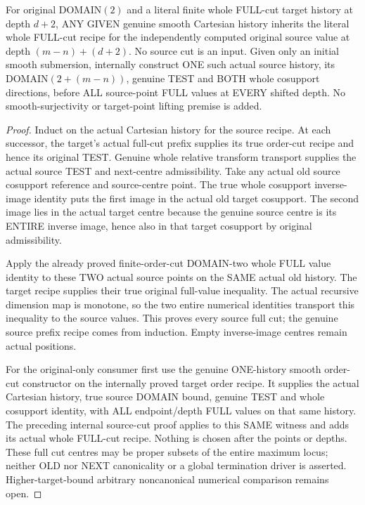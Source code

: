 \begin{theorem}
\label{hir:original-finite-full-cut-domain-two-smooth-history}
\leanok
For original DOMAIN$(2)$ and a literal finite whole FULL-cut target history
at depth $d+2$, ANY GIVEN genuine smooth Cartesian history inherits the
literal whole FULL-cut recipe for the independently computed original
source value at depth $(m-n)+(d+2)$. No source cut is an input.
Given only an initial smooth submersion, internally construct ONE such
actual source history, its DOMAIN$(2+(m-n))$, genuine TEST and BOTH whole
cosupport directions, before ALL source-point FULL values at EVERY shifted
depth. No smooth-surjectivity or target-point lifting premise is added.
\end{theorem}
\begin{proof}
Induct on the actual Cartesian history for the source recipe. At each
successor, the target's actual full-cut prefix supplies its true order-cut
recipe and hence its original TEST. Genuine whole relative transform
transport supplies the actual source TEST and next-centre admissibility.
Take any actual old source cosupport reference and source-centre point.
The true whole cosupport inverse-image identity puts the first image in
the actual old target cosupport. The second image lies in the actual
target centre because the genuine source centre is its ENTIRE inverse
image, hence also in that target cosupport by original admissibility.

Apply the already proved finite-order-cut DOMAIN-two whole FULL value
identity to these TWO actual source points on the SAME actual old history.
The target recipe supplies their true original full-value inequality.
The actual recursive dimension map is monotone, so the two entire
numerical identities transport this inequality to the source values.
This proves every source full cut; the genuine source prefix recipe comes
from induction. Empty inverse-image centres remain actual positions.

For the original-only consumer first use the genuine ONE-history smooth
order-cut constructor on the internally proved target order recipe. It
supplies the actual Cartesian history, true source DOMAIN bound, genuine
TEST and whole cosupport identity, with ALL endpoint/depth FULL values on
that same history. The preceding internal source-cut proof applies to
this SAME witness and adds its actual whole FULL-cut recipe. Nothing is
chosen after the points or depths. These full cut centres may be proper
subsets of the entire maximum locus; neither OLD nor NEXT canonicality
or a global termination driver is asserted. Higher-target-bound arbitrary
noncanonical numerical comparison remains open.
\end{proof}
